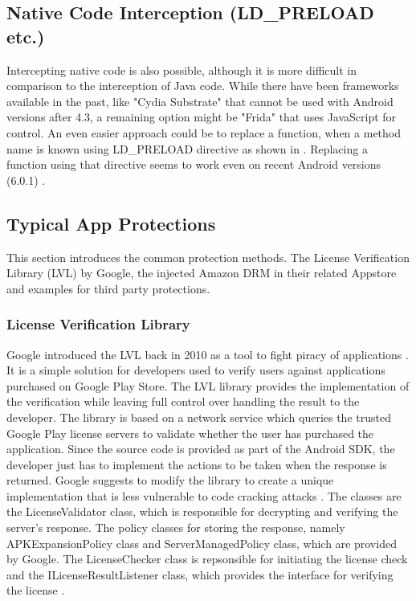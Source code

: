\documentclass{sig-alternate}
\begin{document}
\subsection{Native Code Interception (LD\_PRELOAD etc.) }

Intercepting native code is also possible, although it is more difficult in comparison to the interception of Java code. While there have been frameworks available in the past, like "Cydia Substrate" \cite{AT5} that cannot be used with Android versions after 4.3, a remaining option might be "Frida" \cite{AT6} that uses JavaScript for control. An even easier approach could be to replace a function, when a method name is known using LD\_PRELOAD directive as shown in \cite{AT8}. Replacing a function using that directive seems to work even on recent Android versions (6.0.1) \cite{nils}.

\subsection{Typical App Protections}
This section introduces the common protection methods. The License Verification Library (LVL) by Google, the injected Amazon DRM in their related Appstore and examples for third party protections.

\subsubsection{License Verification Library}
Google introduced the LVL back in 2010 as a tool to fight piracy of applications \cite{lvlRelease}.
It is a simple solution for developers used to verify users against applications purchased on Google Play Store.
The LVL library provides the implementation of the verification while leaving full control over handling the result to the developer.
The library is based on a network service which queries the trusted Google Play license servers to validate whether the user has purchased the application.
Since the source code is provided as part of the Android SDK, the developer just has to implement  the actions to be taken when the response is returned.
Google suggests to modify the library to create a unique implementation that is less vulnerable to code cracking attacks \cite{lvlOverview}\cite{lvlSetup}. 
The classes are the LicenseValidator class, which is responsible for decrypting and verifying the server's response. The policy classes for storing the response, namely APKExpansionPolicy class and ServerManagedPolicy class, which are provided by Google.
The LicenseChecker class is repsonsible for initiating the license check and the ILicenseResultListener class, which provides the interface for verifying the license \cite{addingLvl}.\\
\end{document}
